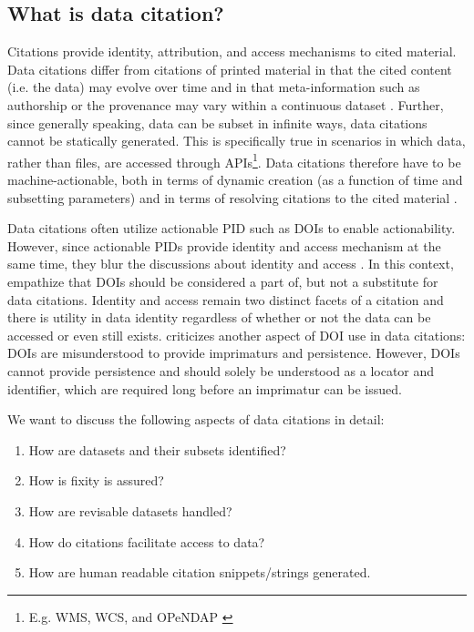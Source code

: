 \documentclass[letterpaper, twocolumn, parskip=half, fontsize=8pt, DIV=calc]{scrartcl}
\begin{document}
\subsection{What is data citation?}
Citations provide identity, attribution, and access mechanisms to cited material. 
Data citations differ from citations of printed material in that the cited content (i.e. the data) may evolve over time and in that meta-information such as authorship or the provenance may vary within a continuous dataset \citep{Buneman2016}. Further, since generally speaking, data can be subset in infinite ways, data citations cannot be statically generated. 
This is specifically true in scenarios in which data, rather than files, are accessed through APIs\footnote{E.g. \gls{WMS}, \gls{WCS}, and \gls{OPeNDAP} \citep{Gallagher2005}}. 
Data citations therefore have to be machine-actionable, both in terms of dynamic creation (as a function of time and subsetting parameters) and in terms of resolving citations to the cited material \citep{Assante2016, Altman2015, Buneman2016}.

Data citations often utilize actionable \gls{PID} such as \glspl{DOI} to enable actionability. However, since actionable \glspl{PID} provide identity and access mechanism at the same time, they blur the discussions about identity and access \citep{ESIP2012a}. In this context, \cite{Buneman2010} empathize that \glspl{DOI} should be considered a part of, but not a substitute for data citations. Identity and access remain two distinct facets of a citation and there is utility in data identity regardless of whether or not the data can be accessed or even still exists. \Cite{Parsons2013a} criticizes another aspect of \gls{DOI} use in data citations: \Glspl{DOI} are misunderstood to provide imprimaturs and persistence. However, \glspl{DOI} cannot provide persistence and should solely be understood as a locator and identifier, which are required long before an imprimatur can be issued.

We want to discuss the following aspects of data citations in detail:
\begin{enumerate}
 \item How are datasets and their subsets identified? 
 \item How is fixity is assured? 
 \item How are revisable datasets handled? 
 \item How do citations facilitate access to data? 
 \item How are human readable citation snippets/strings generated.
\end{enumerate}
\end{document}
